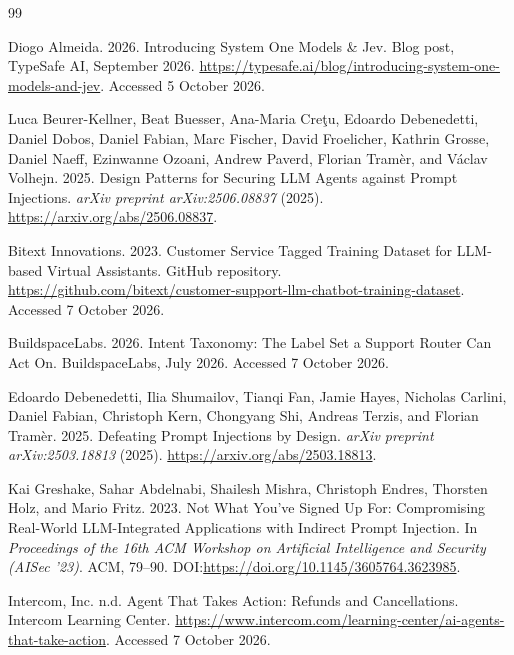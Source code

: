 \documentclass[sigconf,nonacm]{acmart}
\begin{document}
\begin{thebibliography}{99}

Diogo Almeida. 2026.
\newblock Introducing System One Models \& Jev.
\newblock Blog post, TypeSafe AI, September 2026. \url{https://typesafe.ai/blog/introducing-system-one-models-and-jev}. Accessed 5 October 2026.

Luca Beurer-Kellner, Beat Buesser, Ana-Maria Cre\c{t}u, Edoardo Debenedetti, Daniel Dobos, Daniel Fabian, Marc Fischer, David Froelicher, Kathrin Grosse, Daniel Naeff, Ezinwanne Ozoani, Andrew Paverd, Florian Tram{\`e}r, and V{\'a}clav Volhejn. 2025.
\newblock Design Patterns for Securing {LLM} Agents against Prompt Injections.
\newblock \emph{arXiv preprint arXiv:2506.08837} (2025). \url{https://arxiv.org/abs/2506.08837}.

Bitext Innovations. 2023.
\newblock Customer Service Tagged Training Dataset for {LLM}-based Virtual Assistants.
\newblock GitHub repository. \url{https://github.com/bitext/customer-support-llm-chatbot-training-dataset}. Accessed 7 October 2026.

BuildspaceLabs. 2026.
\newblock Intent Taxonomy: The Label Set a Support Router Can Act On.
\newblock BuildspaceLabs, July 2026.
 Accessed 7 October 2026.

Edoardo Debenedetti, Ilia Shumailov, Tianqi Fan, Jamie Hayes, Nicholas Carlini, Daniel Fabian, Christoph Kern, Chongyang Shi, Andreas Terzis, and Florian Tram{\`e}r. 2025.
\newblock Defeating Prompt Injections by Design.
\newblock \emph{arXiv preprint arXiv:2503.18813} (2025). \url{https://arxiv.org/abs/2503.18813}.

Kai Greshake, Sahar Abdelnabi, Shailesh Mishra, Christoph Endres, Thorsten Holz, and Mario Fritz. 2023.
\newblock Not What You've Signed Up For: Compromising Real-World {LLM}-Integrated Applications with Indirect Prompt Injection.
\newblock In \emph{Proceedings of the 16th ACM Workshop on Artificial Intelligence and Security (AISec '23)}. ACM, 79--90. DOI:\url{https://doi.org/10.1145/3605764.3623985}.

\balance

Intercom, Inc. n.d.
 Agent That Takes Action: Refunds and Cancellations.
\newblock Intercom Learning Center. \url{https://www.intercom.com/learning-center/ai-agents-that-take-action}. Accessed 7 October 2026.


\end{thebibliography}
\end{document}
